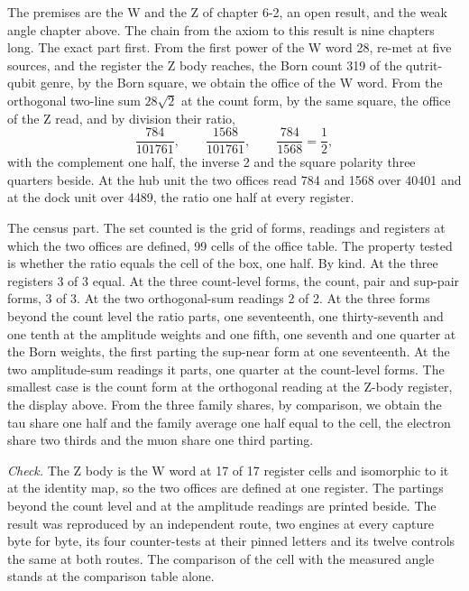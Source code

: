 \begin{chproof}[census]
The premises are the W and the Z of chapter 6-2, an open result, and the weak angle chapter above. The chain from the axiom to this result is nine chapters long. The exact part first. From the first power of the W word 28, re-met at five sources, and the register the Z body reaches, the Born count 319 of the qutrit-qubit genre, by the Born square, we obtain the office of the W word. From the orthogonal two-line sum $28\sqrt{2}$ at the count form, by the same square, the office of the Z read, and by division their ratio,
\begin{equation}
\frac{784}{101761}, \qquad \frac{1568}{101761}, \qquad \frac{784}{1568} = \frac{1}{2} ,
\end{equation}
with the complement one half, the inverse 2 and the square polarity three quarters beside. At the hub unit the two offices read 784 and 1568 over 40401 and at the dock unit over 4489, the ratio one half at every register.

The census part. The set counted is the grid of forms, readings and registers at which the two offices are defined, 99 cells of the office table. The property tested is whether the ratio equals the cell of the box, one half. By kind. At the three registers 3 of 3 equal. At the three count-level forms, the count, pair and sup-pair forms, 3 of 3. At the two orthogonal-sum readings 2 of 2. At the three forms beyond the count level the ratio parts, one seventeenth, one thirty-seventh and one tenth at the amplitude weights and one fifth, one seventh and one quarter at the Born weights, the first parting the sup-near form at one seventeenth. At the two amplitude-sum readings it parts, one quarter at the count-level forms. The smallest case is the count form at the orthogonal reading at the Z-body register, the display above. From the three family shares, by comparison, we obtain the tau share one half and the family average one half equal to the cell, the electron share two thirds and the muon share one third parting.

\emph{Check.} The Z body is the W word at 17 of 17 register cells and isomorphic to it at the identity map, so the two offices are defined at one register. The partings beyond the count level and at the amplitude readings are printed beside. The result was reproduced by an independent route, two engines at every capture byte for byte, its four counter-tests at their pinned letters and its twelve controls the same at both routes.
The comparison of the cell with the measured angle stands at the comparison table alone.
\end{chproof}
\label{chend:VI-6-D539022-wazb-t1}
